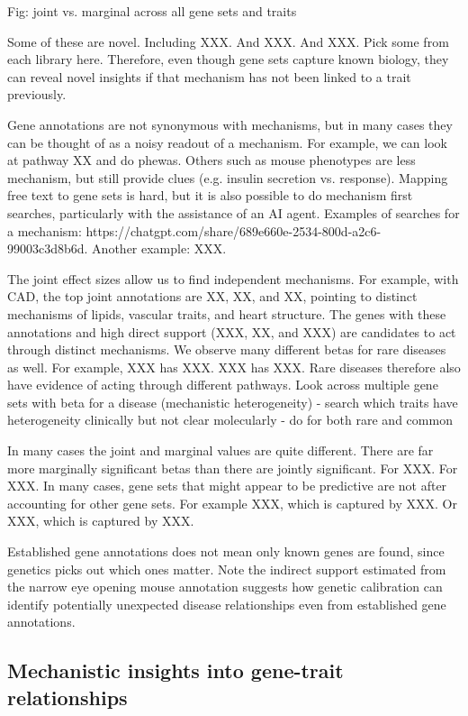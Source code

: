 \documentclass[sn-nature,lineno]{sn-jnl}%
\theoremstyle{thmstyleone}%
\theoremstyle{thmstyletwo}%
\theoremstyle{thmstylethree}%
\begin{document}
Fig: joint vs. marginal across all gene sets and traits

Some of these are novel. Including XXX. And XXX. And XXX. Pick some from each library here. Therefore, even though gene sets capture known biology, they can reveal novel insights if that mechanism has not been linked to a trait previously.

Gene annotations are not synonymous with mechanisms, but in many cases they can be thought of as a noisy readout of a mechanism. For example, we can look at pathway XX and do phewas. Others such as mouse phenotypes are less mechanism, but still provide clues (e.g. insulin secretion vs. response). Mapping free text to gene sets is hard, but it is also possible to do mechanism first searches, particularly with the assistance of an AI agent. Examples of searches for a mechanism:  https://chatgpt.com/share/689e660e-2534-800d-a2c6-99003c3d8b6d. Another example: XXX.

The joint effect sizes allow us to find independent mechanisms. For example, with CAD, the top joint annotations are XX, XX, and XX, pointing to distinct mechanisms of lipids, vascular traits, and heart structure. The genes with these annotations and high direct support (XXX, XX, and XXX) are candidates to act through distinct mechanisms. We observe many different betas for rare diseases as well. For example, XXX has XXX. XXX has XXX. Rare diseases therefore also have evidence of acting through different pathways. Look across multiple gene sets with beta for a disease (mechanistic heterogeneity)
 - search which traits have heterogeneity clinically but not clear molecularly
 - do for both rare and common

In many cases the joint and marginal values are quite different. There are far more marginally significant betas than there are jointly significant. For XXX. For XXX. In many cases, gene sets that might appear to be predictive are not after accounting for other gene sets. For example XXX, which is captured by XXX. Or XXX, which is captured by XXX.

Established gene annotations does not mean only known genes are found, since genetics picks out which ones matter. Note the indirect support estimated from the narrow eye opening mouse annotation suggests how genetic calibration can identify potentially unexpected disease relationships even from established gene annotations.

\subsection{Mechanistic insights into gene-trait relationships}
\end{document}
